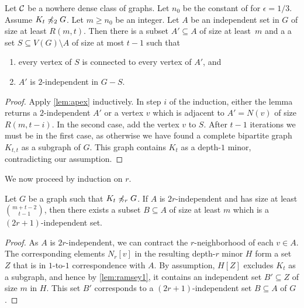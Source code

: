 \begin{lemma}\label{lem:iterate-apex}
Let $\mathcal{C}$ be a nowhere dense class of graphs. 
Let $n_0$ be the constant of for $\epsilon=1/3$. 
Assume $K_t\not\preccurlyeq_2 G$. 
Let $m\geq n_0$ be an integer. 
Let $A$ be an independent set in $G$ of size at least $R(m,t)$. 
Then there is a subset $A'\subseteq A$ of size at least~$m$ and a 
a set $S\subseteq V(G)\setminus A$ of size at most $t-1$ such that
\begin{enumerate}
\item every vertex of $S$ is connected to every vertex of $A'$, and
\item $A'$ is $2$-independent in $G-S$. 
\end{enumerate} 
\end{lemma}
\begin{proof}
Apply \cref{lem:apex} inductively. In step $i$ of the induction,
either the lemma returns a $2$-independent $A'$ or a vertex $v$
which is adjacent to $A'=N(v)$ of size $R(m,t-i)$. In the second
case, add the vertex $v$ to $S$. After $t-1$
iterations we must be in the first case, as otherwise we have found a 
complete bipartite graph $K_{t,t}$ as a subgraph of $G$. 
This graph contains $K_t$ as a depth-$1$ minor, contradicting
our assumption. 
\end{proof}

We now proceed by induction on $r$. 

\begin{lemma}\label{lem:ramsey2}
Let $G$ be a graph such that $K_t\not\preccurlyeq_r G$. 
If $A$ is $2r$-independent and
has size at least $\binom{m+t-2}{t-1}$, then there exists
a subset $B\subseteq A$ of size at least $m$ which is a
$(2r+1)$-independent set. 
\end{lemma}
\begin{proof}
As $A$ is $2r$-independent, we can contract the $r$-neighborhood
of each $v\in A$. The corresponding elements $N_r[v]$ in the resulting 
depth-$r$ minor $H$ form a set $Z$ that is in \mbox{$1$-to-$1$} correspondence 
with $A$. By assumption, 
$H[Z]$ excludes $K_t$ as a subgraph, and hence by \cref{lem:ramsey1},
it contains an independent set $B'\subseteq Z$ of size $m$ in $H$. 
This set $B'$ corresponds to a $(2r+1)$-independent set $B\subseteq A$ of $G$. 
\end{proof}

